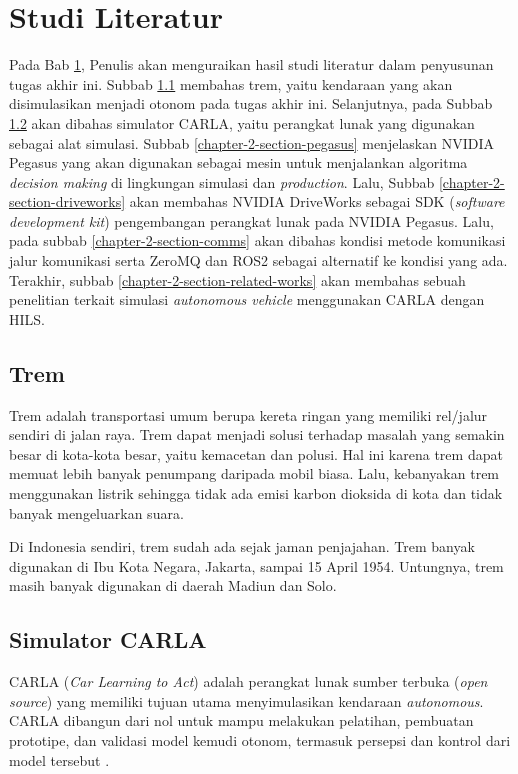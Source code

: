 \chapter{Studi Literatur}\label{chapter-2}

Pada Bab \ref{chapter-2}, Penulis akan menguraikan hasil studi literatur dalam
penyusunan tugas akhir ini. Subbab \ref{chapter-2-section-trem} membahas trem,
yaitu kendaraan yang akan disimulasikan menjadi otonom pada tugas akhir ini.
Selanjutnya, pada Subbab \ref{chapter-2-section-carla} akan dibahas simulator
CARLA, yaitu perangkat lunak yang digunakan sebagai alat simulasi.  Subbab
\ref{chapter-2-section-pegasus} menjelaskan NVIDIA Pegasus yang akan digunakan
sebagai mesin untuk menjalankan algoritma \textit{decision making} di lingkungan
simulasi dan \textit{production}. Lalu, Subbab
\ref{chapter-2-section-driveworks} akan membahas NVIDIA DriveWorks sebagai SDK
(\textit{software development kit}) pengembangan perangkat lunak pada NVIDIA
Pegasus. Lalu, pada subbab \ref{chapter-2-section-comms} akan dibahas kondisi
metode komunikasi jalur komunikasi serta ZeroMQ dan ROS2 sebagai alternatif ke
kondisi yang ada. Terakhir, subbab \ref{chapter-2-section-related-works} akan
membahas sebuah penelitian terkait simulasi \textit{autonomous vehicle}
menggunakan CARLA dengan HILS.

\section{Trem}\label{chapter-2-section-trem}

Trem adalah transportasi umum berupa kereta ringan yang memiliki rel/jalur
sendiri di jalan raya. Trem dapat menjadi solusi terhadap masalah yang semakin
besar di kota-kota besar, yaitu kemacetan dan polusi. Hal ini karena trem dapat
memuat lebih banyak penumpang daripada mobil biasa. Lalu, kebanyakan trem
menggunakan listrik sehingga tidak ada emisi karbon dioksida di kota dan tidak
banyak mengeluarkan suara.

Di Indonesia sendiri, trem sudah ada sejak jaman penjajahan. Trem banyak
digunakan di Ibu Kota Negara, Jakarta, sampai 15 April 1954. Untungnya, trem
masih banyak digunakan di daerah Madiun dan Solo.

\section{Simulator CARLA}\label{chapter-2-section-carla}

CARLA (\textit{Car Learning to Act}) adalah perangkat lunak sumber terbuka
(\textit{open source}) yang memiliki tujuan utama menyimulasikan kendaraan
\textit{autonomous}. CARLA dibangun dari nol untuk mampu melakukan pelatihan,
pembuatan prototipe, dan validasi model kemudi otonom, termasuk persepsi dan
kontrol dari model tersebut \parencite{dos_carla}.

